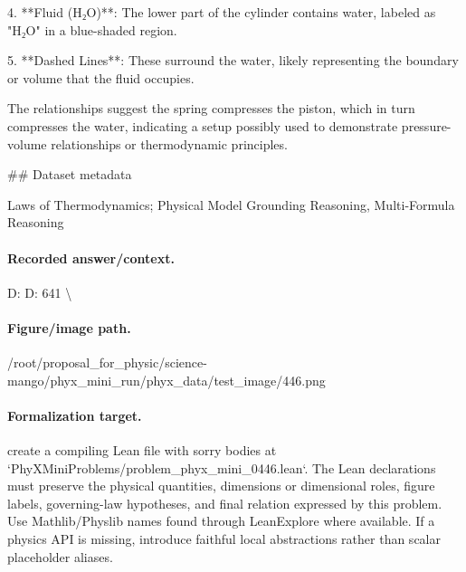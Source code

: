 4. **Fluid (H₂O)**: The lower part of the cylinder contains water, labeled as "H₂O" in a blue-shaded region.

5. **Dashed Lines**: These surround the water, likely representing the boundary or volume that the fluid occupies.

The relationships suggest the spring compresses the piston, which in turn compresses the water, indicating a setup possibly used to demonstrate pressure-volume relationships or thermodynamic principles.

\#\# Dataset metadata

Laws of Thermodynamics; Physical Model Grounding Reasoning, Multi-Formula Reasoning

\paragraph{Recorded answer/context.}
D: D: 641 \textbackslash{}

\paragraph{Figure/image path.}
/root/proposal\_for\_physic/science-mango/phyx\_mini\_run/phyx\_data/test\_image/446.png

\paragraph{Formalization target.}
create a compiling Lean file with sorry bodies at `PhyXMiniProblems/problem\_phyx\_mini\_0446.lean`. The Lean declarations must preserve the physical quantities, dimensions or dimensional roles, figure labels, governing-law hypotheses, and final relation expressed by this problem.
Use Mathlib/Physlib names found through LeanExplore where available. If a physics API is missing, introduce faithful local abstractions rather than scalar placeholder aliases.

